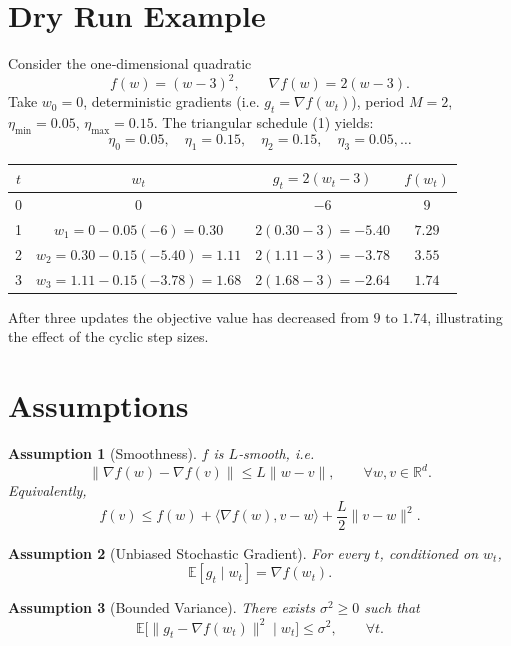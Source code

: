 \documentclass{article}
\newtheorem{assumption}{Assumption}
\begin{document}
\section*{Dry Run Example}
Consider the one‑dimensional quadratic
\[
f(w)=(w-3)^2,\qquad \nabla f(w)=2(w-3).
\]
Take $w_0=0$, deterministic gradients (i.e. $g_t=\nabla f(w_t)$), period $M=2$, $\eta_{\min}=0.05$, $\eta_{\max}=0.15$.  
The triangular schedule (1) yields:
\[
\eta_0=0.05,\quad \eta_1=0.15,\quad \eta_2=0.15,\quad \eta_3=0.05,\dots
\]

\begin{center}
\begin{tabular}{c|c|c|c}
$t$ & $w_t$ & $g_t=2(w_t-3)$ & $f(w_t)$\\ \hline
0 & $0$ & $-6$ & $9$\\
1 & $w_1=0-0.05(-6)=0.30$ & $2(0.30-3)=-5.40$ & $7.29$\\
2 & $w_2=0.30-0.15(-5.40)=1.11$ & $2(1.11-3)=-3.78$ & $3.55$\\
3 & $w_3=1.11-0.15(-3.78)=1.68$ & $2(1.68-3)=-2.64$ & $1.74$
\end{tabular}
\end{center}
After three updates the objective value has decreased from $9$ to $1.74$, illustrating the effect of the cyclic step sizes.

\section*{Assumptions}
\begin{assumption}[Smoothness]\label{ass:smooth}
$f$ is $L$‑smooth, i.e.
\[
\|\nabla f(w)-\nabla f(v)\|\le L\|w-v\|,\qquad\forall w,v\in\mathbb{R}^d.
\tag{4}
\]
Equivalently,
\[
f(v)\le f(w)+\langle\nabla f(w),v-w\rangle+\frac{L}{2}\|v-w\|^2 .
\tag{5}
\]
\end{assumption}

\begin{assumption}[Unbiased Stochastic Gradient]\label{ass:unbiased}
For every $t$, conditioned on $w_t$,
\[
\mathbb{E}[g_t\mid w_t]=\nabla f(w_t).
\tag{6}
\]
\end{assumption}

\begin{assumption}[Bounded Variance]\label{ass:variance}
There exists $\sigma^2\ge0$ such that
\[
\mathbb{E}\bigl[\|g_t-\nabla f(w_t)\|^2\mid w_t\bigr]\le\sigma^2,\qquad\forall t.
\tag{7}
\]
\end{assumption}
\end{document}

